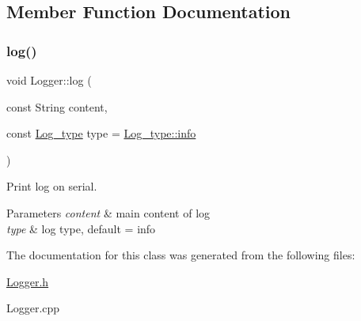 \subsection{Member Function Documentation}
\mbox{\label{class_logger_a536e1be03317832843ab8bae6c135a95}} 
\subsubsection{\texorpdfstring{log()}{log()}}
{\footnotesize\ttfamily void Logger\+::log (\begin{DoxyParamCaption}\item[{const String}]{content,  }\item[{const \hyperlink{_logger_8h_aecc80a60e65b789643a9f14bcead1d57}{Log\+\_\+type}}]{type = {\ttfamily \hyperlink{_logger_8h_aecc80a60e65b789643a9f14bcead1d57acaf9b6b99962bf5c2264824231d7a40c}{Log\+\_\+type\+::info}} }\end{DoxyParamCaption})}



Print log on serial. 


\begin{DoxyParams}{Parameters}
{\em content} & main content of log \\
\hline
{\em type} & log type, default = info \\
\hline
\end{DoxyParams}


The documentation for this class was generated from the following files\+:\begin{DoxyCompactItemize}
\item 
\hyperlink{_logger_8h}{Logger.\+h}\item 
Logger.\+cpp\end{DoxyCompactItemize}
